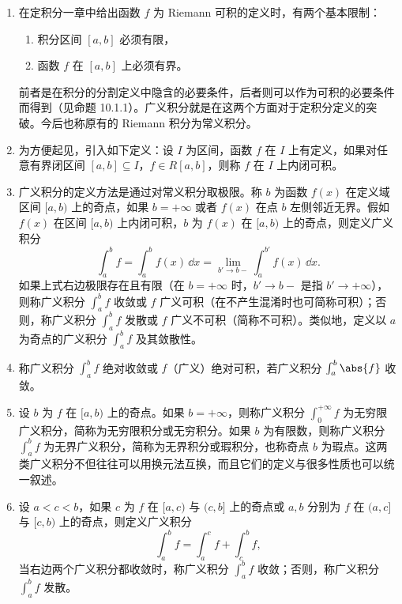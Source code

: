 \begin{enumerate}
  \item 在定积分一章中给出函数 $f$ 为 Riemann 可积的定义时，有两个基本限制：
  \begin{enumerate}[label=(\arabic*)]
    \item 积分区间 $[a,b]$ 必须有限，
    \item 函数 $f$ 在 $[a,b]$ 上必须有界。
  \end{enumerate}
  前者是在积分的分割定义中隐含的必要条件，后者则可以作为可积的必要条件而得到（见命题 10.1.1）。广义积分就是在这两个方面对于定积分定义的突破。今后也称原有的 Riemann 积分为常义积分。

  \item 为方便起见，引入如下定义：设 $I$ 为区间，函数 $f$ 在 $I$ 上有定义，如果对任意有界闭区间 $[a,b]\subseteq I$，$f\in R[a,b]$，则称 $f$ 在 $I$ 上内闭可积。

  \item 广义积分的定义方法是通过对常义积分取极限。称 $b$ 为函数 $f(x)$ 在定义域区间 $[a,b)$ 上的奇点，如果 $b=+\infty$ 或者 $f(x)$ 在点 $b$ 左侧邻近无界。假如 $f(x)$ 在区间 $[a,b)$ 上内闭可积，$b$ 为 $f(x)$ 在 $[a,b)$ 上的奇点，则定义广义积分
  \[
    \int_a^b f=\int_a^b f(x)\,\dd x=\lim_{b'\to b-}\int_a^{b'}f(x)\,\dd x.
  \]
  如果上式右边极限存在且有限（在 $b=+\infty$ 时，$b'\to b-$ 是指 $b'\to+\infty$），则称广义积分 $\int_a^b f$ 收敛或 $f$ 广义可积（在不产生混淆时也可简称可积）；否则，称广义积分 $\int_a^b f$ 发散或 $f$ 广义不可积（简称不可积）。类似地，定义以 $a$ 为奇点的广义积分 $\int_a^b f$ 及其敛散性。

  \item 称广义积分 $\int_a^b f$ 绝对收敛或 $f$（广义）绝对可积，若广义积分 $\int_a^b\abs{f}$ 收敛。

  \item 设 $b$ 为 $f$ 在 $[a,b)$ 上的奇点。如果 $b=+\infty$，则称广义积分 $\int_0^{+\infty}f$ 为无穷限广义积分，简称为无穷限积分或无穷积分。如果 $b$ 为有限数，则称广义积分 $\int_a^b f$ 为无界广义积分，简称为无界积分或瑕积分，也称奇点 $b$ 为瑕点。这两类广义积分不但往往可以用换元法互换，而且它们的定义与很多性质也可以统一叙述。

  \item 设 $a<c<b$，如果 $c$ 为 $f$ 在 $[a,c)$ 与 $(c,b]$ 上的奇点或 $a,b$ 分别为 $f$ 在 $(a,c]$ 与 $[c,b)$ 上的奇点，则定义广义积分
  \[
    \int_a^b f=\int_a^c f+\int_c^b f,
  \]
  当右边两个广义积分都收敛时，称广义积分 $\int_a^b f$ 收敛；否则，称广义积分 $\int_a^b f$ 发散。
\end{enumerate}

